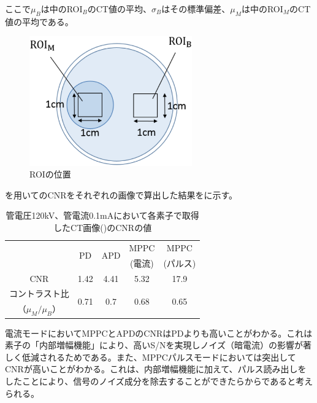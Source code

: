 ここで$\mu_B$は中のROI$_B$のCT値の平均、$\sigma_B$はその標準偏差、$\mu_M$は中のROI$_M$のCT値の平均である。

\begin{figure}[H]
 \begin{center}
 \includegraphics[width=7cm]{image2/chapter5/ROI.eps}
 \end{center}
 \caption{ROIの位置}
 \label{fig:ROI}
\end{figure}

を用いてのCNRをそれぞれの画像で算出した結果をに示す。

\begin{table}[H]
  \centering
    \begin{tabular}{ccccc}
    \toprule
    \multirow{2}[2]{*}{} & \multirow{2}[2]{*}{PD} & \multirow{2}[2]{*}{APD} & MPPC  & MPPC \\
          &       &       & (電流)  & (パルス) \\
    \midrule
    CNR   & 1.42  & 4.41  & 5.32  & 17.9 \\
    コントラスト比 & \multirow{2}[1]{*}{0.71} & \multirow{2}[1]{*}{0.7} & \multirow{2}[1]{*}{0.68} & \multirow{2}[1]{*}{0.65} \\
    （$\mu_M/\mu_B$） &       &       &       &  \\
    \bottomrule
    \end{tabular}%
         \caption{管電圧120kV、管電流0.1mAにおいて各素子で取得したCT画像()のCNRの値}
  \label{tab:cnr}%
\end{table}%

電流モードにおいてMPPCとAPDのCNRはPDよりも高いことがわかる。これは素子の「内部増幅機能」により、高いS/Nを実現しノイズ（暗電流）の影響が著しく低減されるためである。また、MPPCパルスモードにおいては突出してCNRが高いことがわかる。これは、内部増幅機能に加えて、パルス読み出しをしたことにより、信号のノイズ成分を除去することができたらからであると考えられる。

